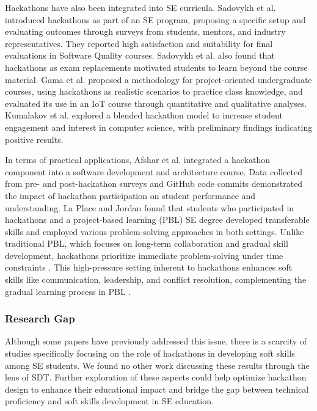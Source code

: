Hackathons have also been integrated into SE curricula.  Sadovykh et al. \cite{sadovykh2020hackathons} introduced hackathons as part of an SE program, proposing a specific setup and evaluating outcomes through surveys from students, mentors, and industry representatives. They reported high satisfaction and suitability for final evaluations in Software Quality courses. Sadovykh et al. \cite{sadovykh4hackathon} also found that hackathons as exam replacements motivated students to learn beyond the course material. Gama et al. \cite{gama2018hackathon} proposed a methodology for project-oriented undergraduate courses, using hackathons as realistic scenarios to practice class knowledge, and evaluated its use in an IoT course through quantitative and qualitative analyses. Kumalakov et al. \cite{kumalakov2018hackathon} explored a blended hackathon model to increase student engagement and interest in computer science, with preliminary findings indicating positive results.

In terms of practical applications, Afshar et al. \cite{afshar2022hackathon} integrated a hackathon component into a software development and architecture course. Data collected from pre- and post-hackathon surveys and GitHub code commits demonstrated the impact of hackathon participation on student performance and understanding. La Place and Jordan \cite{la2022adapting} found that students who participated in hackathons and a project-based learning (PBL) SE degree developed transferable skills and employed various problem-solving approaches in both settings. Unlike traditional PBL, which focuses on long-term collaboration and gradual skill development, hackathons prioritize immediate problem-solving under time constraints \cite{szymanska2020effects}. This high-pressure setting inherent to hackathons enhances soft skills like communication, leadership, and conflict resolution, complementing the gradual learning process in PBL \cite{garcia2023fostering}.

\subsubsection{Research Gap} Although some papers have previously addressed this issue, there is a scarcity of studies specifically focusing on the role of hackathons in developing soft skills among SE students. We found no other work discussing these results through the lens of SDT. Further exploration of these aspects could help optimize hackathon design to enhance their educational impact and bridge the gap between technical proficiency and soft skills development in SE education.

